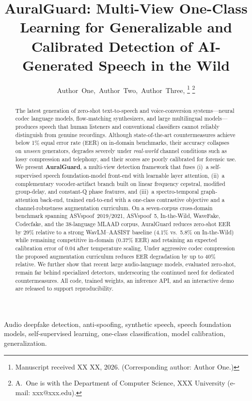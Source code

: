 \documentclass[journal]{IEEEtran}
\title{AuralGuard: Multi-View One-Class Learning for Generalizable and
Calibrated Detection of AI-Generated Speech in the Wild}
\author{Author~One,~Author~Two,~Author~Three,
\IEEEmembership{Member,~IEEE}%
\thanks{Manuscript received XX XX, 2026. (Corresponding author: Author One.)}%
\thanks{A.~One is with the Department of Computer Science, XXX University (e-mail: xxx@xxx.edu).}}
\begin{document}
\maketitle

\begin{abstract}
The latest generation of zero-shot text-to-speech and voice-conversion systems---neural
codec language models, flow-matching synthesizers, and large multilingual
models---produces speech that human listeners and conventional classifiers cannot
reliably distinguish from genuine recordings. Although state-of-the-art
countermeasures achieve below 1\% equal error rate (EER) on in-domain benchmarks, their
accuracy collapses on \emph{unseen} generators, degrades severely under \emph{real-world}
channel conditions such as lossy compression and telephony, and their scores are poorly
calibrated for forensic use. We present \textbf{AuralGuard}, a multi-view detection
framework that fuses (i)~a self-supervised speech foundation-model front-end with
learnable layer attention, (ii)~a complementary vocoder-artifact branch built on linear
frequency cepstral, modified group-delay, and constant-Q phase features, and (iii)~a
spectro-temporal graph-attention back-end, trained end-to-end with a one-class
contrastive objective and a channel-robustness augmentation curriculum. On a
seven-corpus cross-domain benchmark spanning ASVspoof~2019/2021, ASVspoof~5,
In-the-Wild, WaveFake, Codecfake, and the 38-language MLAAD corpus, AuralGuard reduces
zero-shot EER by 29\% relative to a strong WavLM--AASIST baseline (4.1\% vs.\ 5.8\% on
In-the-Wild) while remaining competitive in-domain (0.37\% EER) and retaining an
expected calibration error of 0.04 after temperature scaling. Under aggressive codec
compression the proposed augmentation curriculum reduces EER degradation by up to 40\%
relative. We further show that recent large audio-language models, evaluated zero-shot,
remain far behind specialized detectors, underscoring the continued need for dedicated
countermeasures. All code, trained weights, an inference API, and an interactive demo
are released to support reproducibility.
\end{abstract}

\begin{IEEEkeywords}
Audio deepfake detection, anti-spoofing, synthetic speech, speech foundation models,
self-supervised learning, one-class classification, model calibration, generalization.
\end{IEEEkeywords}
\end{document}
